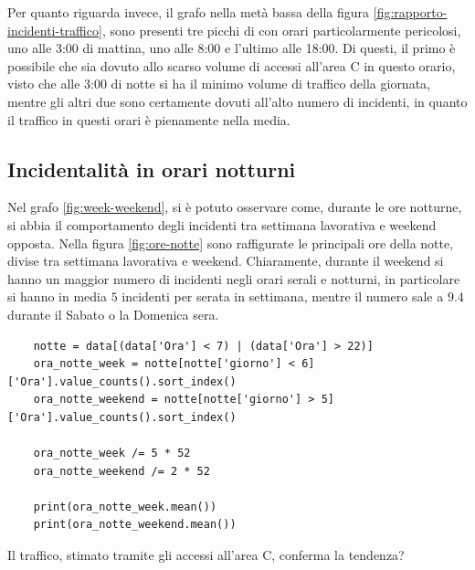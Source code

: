 \documentclass[a4paper]{report}
\begin{document}
Per quanto riguarda invece, il grafo nella metà bassa della figura \ref{fig:rapporto-incidenti-traffico}, 
sono presenti tre picchi di con orari particolarmente pericolosi, uno alle 3:00 di mattina, uno alle 
8:00 e l'ultimo alle 18:00. 
Di questi, il primo è possibile che sia dovuto allo scarso volume di accessi all'area C in questo orario, 
visto che alle 3:00 di notte si ha il minimo volume di traffico della giornata, 
mentre gli altri due sono certamente dovuti all'alto numero di incidenti, in quanto il traffico in questi 
orari è pienamente nella media.

\subsection{Incidentalità in orari notturni}

Nel grafo \ref{fig:week-weekend}, si è potuto osservare come, durante le 
ore notturne, si abbia il comportamento degli incidenti tra settimana lavorativa e weekend opposta.
Nella figura \ref{fig:ore-notte} sono raffigurate le principali ore della notte, divise tra 
settimana lavorativa e weekend.
Chiaramente, durante il weekend si hanno un maggior numero di incidenti negli orari serali e 
notturni, in particolare si hanno in media $5$ incidenti per serata in settimana, mentre il numero 
sale a $9.4$ durante il Sabato o la Domenica sera.

\begin{lstlisting}
    notte = data[(data['Ora'] < 7) | (data['Ora'] > 22)]
    ora_notte_week = notte[notte['giorno'] < 6]['Ora'].value_counts().sort_index()
    ora_notte_weekend = notte[notte['giorno'] > 5]['Ora'].value_counts().sort_index()

    ora_notte_week /= 5 * 52 
    ora_notte_weekend /= 2 * 52

    print(ora_notte_week.mean())
    print(ora_notte_weekend.mean())
\end{lstlisting}

Il traffico, stimato tramite gli accessi all'area C, conferma la tendenza?
\end{document}
